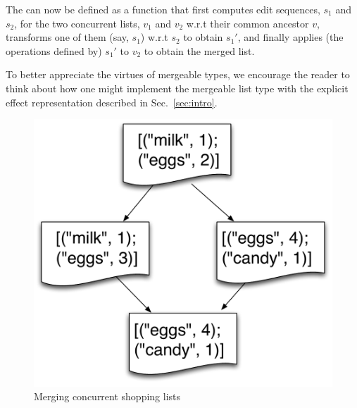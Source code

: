The  can now be defined as a function that first
computes edit sequences, $s_1$ and $s_2$, for the two concurrent
lists, $v_1$ and $v_2$ w.r.t their common ancestor $v$, transforms one
of them (say, $s_1$) w.r.t $s_2$ to obtain $s_1'$, and finally applies
(the operations defined by) $s_1'$ to $v_2$ to obtain the merged list.

 To better appreciate the virtues
of mergeable types, we encourage the reader to think about how one
might implement the mergeable list type with the explicit effect
representation described in Sec.~\ref{sec:intro}.

\begin{figure}
  \centering
  \includegraphics[scale=0.4]{Figures/shopping-list}

  \caption{Merging concurrent shopping lists}
  \label{fig:shopping-list}
\end{figure}

